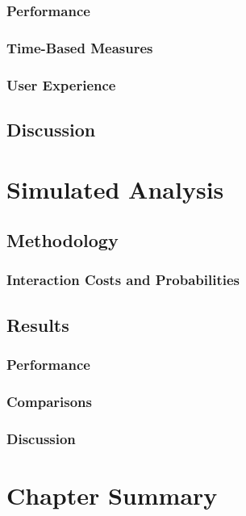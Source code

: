 \subsubsection{Performance}

\subsubsection{Time-Based Measures}

\subsubsection{User Experience}

\subsection{Discussion}

\section{Simulated Analysis}

\subsection{Methodology}

\subsubsection{Interaction Costs and Probabilities}

\subsection{Results}

\subsubsection{Performance}

\subsubsection{Comparisons}

\subsubsection{Discussion}

\section{Chapter Summary}